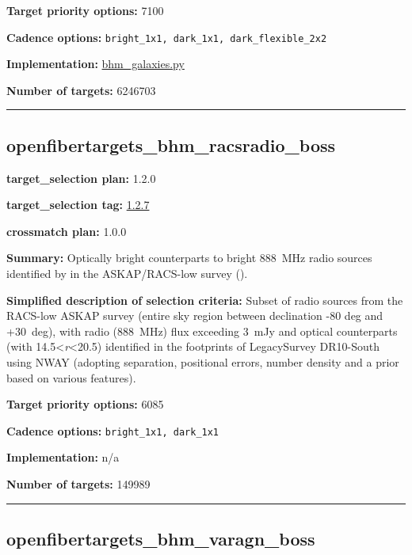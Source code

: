 \noindent\textbf{Target priority options:} 7100

\noindent\textbf{Cadence options:}
\texttt{bright\_1x1,\ dark\_1x1,\ dark\_flexible\_2x2}

\noindent\textbf{Implementation:}
\href{https://github.com/sdss/target_selection/blob/1.0.38/python/target_selection/cartons/bhm_galaxies.py}{bhm\_galaxies.py}

\noindent\textbf{Number of targets:} 6246703

\begin{center}\rule{0.5\linewidth}{0.5pt}\end{center}

\hypertarget{openfibertargets_bhm_racsradio_boss_plan1.2.0}{%
\subsection{openfibertargets\_bhm\_racsradio\_boss}\label{openfibertargets_bhm_racsradio_boss_plan1.2.0}}

\noindent\textbf{target\_selection plan:} 1.2.0

\noindent\textbf{target\_selection tag:}
\href{https://github.com/sdss/target_selection/tree/1.2.7/}{1.2.7}

\noindent\textbf{crossmatch plan:} 1.0.0

\noindent\textbf{Summary:} Optically bright counterparts to bright 888~MHz radio
sources identified by in the ASKAP/RACS-low survey
(\citealt{Hale2021}).

\noindent\textbf{Simplified description of selection criteria:} Subset of radio
sources from the RACS-low ASKAP survey (entire sky region between
declination -80 deg and +30~deg), with radio (888~MHz) flux exceeding
3~mJy and optical counterparts (with
14.5\textless{}\emph{r}\textless20.5) identified in the footprints of
LegacySurvey DR10-South using NWAY (adopting separation, positional
errors, number density and a prior based on various features).


\noindent\textbf{Target priority options:} 6085

\noindent\textbf{Cadence options:} \texttt{bright\_1x1,\ dark\_1x1}

\noindent\textbf{Implementation:} n/a

\noindent\textbf{Number of targets:} 149989

\begin{center}\rule{0.5\linewidth}{0.5pt}\end{center}

\hypertarget{openfibertargets_bhm_varagn_boss_plan1.2.0}{%
\subsection{openfibertargets\_bhm\_varagn\_boss}\label{openfibertargets_bhm_varagn_boss_plan1.2.0}}

